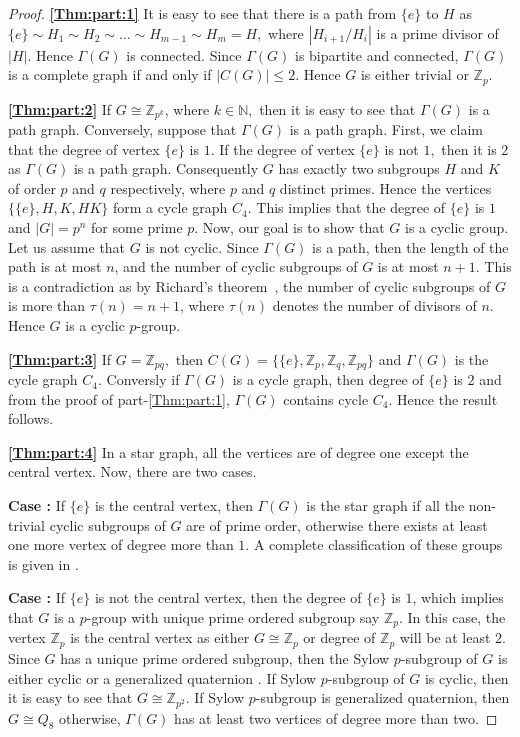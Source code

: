 \documentclass[11pt,twoside]{amsart}
\def \N {{\mathbb{N}}}
\def \Z {{\mathbb{Z}}}
\def \Ga {{\Gamma }}
\begin{document}
        \begin{proof}
     \textbf{\ref{Thm:part:1}}   
     It is easy to see that there is a path from $\{e\}$ to $H$ as $\{e\}\sim H_1\sim H_2 \sim \dots \sim H_{m-1}\sim H_m=H,$ where $|H_{i+1}/H_i|$ is a prime divisor of $|H|.$ Hence $\Gamma(G)$ is connected. Since $\Ga(G)$ is bipartite and connected, $\Ga(G)$ is a complete graph if and only if $|C(G)|\le 2$. Hence $G$ is either trivial or $\Z_p$.

     \noindent
\textbf{\ref{Thm:part:2}} If $G\cong \Z_{p^k}$, where $k\in \N,$ then it is easy to see that $\Ga(G)$ is a path graph. Conversely, suppose that $\Ga(G)$ is a path graph. First, we claim that the degree of vertex $\{e\}$ is $1.$ If the  degree of vertex $\{e\}$ is not $1,$ then it is $2$ as  $\Ga(G)$ is a path graph. Consequently $G$ has  exactly two  subgroups $H$ and $K$ of order $p$ and $q$ respectively, where $p$ and $q$ distinct primes. Hence the vertices $\{\{e\},H,K,HK\}$ form a cycle graph $C_4.$ This implies that the degree of $\{e\}$ is $1$ and $|G|=p^n$ for some prime $p$. Now, our goal is to show that $G$ is a cyclic group. Let us assume that $G$ is not cyclic. Since $\Gamma (G)$ is a path, then the length of the path is at most $n$, and the number of cyclic subgroups of $G$ is at most $n+1$. This is a contradiction as by Richard's theorem~\cite{richards1984remark}, the number of cyclic subgroups of $G$ is more than $\tau (n)=n+1$, where $\tau (n)$ denotes the number of divisors of $n$. Hence $G$ is a cyclic $p$-group.
                

          \noindent \textbf{\ref{Thm:part:3}} If $G=\Z_{pq},$ then $C(G)=\{\{e\},\Z_p,\Z_q, \Z_{pq}\}$ and $\Ga(G)$ is the cycle graph $C_4.$ Conversly if $\Ga(G)$ is a cycle graph, then degree of $\{e\}$ is $2$ and from the proof of part-\ref{Thm:part:1},  $\Ga(G)$ contains cycle $C_4.$ Hence the result follows.
          

     \noindent \textbf{\ref{Thm:part:4}} In a star graph, all the vertices are of degree one except the central vertex. Now, there are two cases.
     
    \textbf{Case :} If $\{e\}$ is the central vertex, then $\Gamma (G)$ is the star graph if all the non-trivial cyclic subgroups of $G$ are of prime order, otherwise there exists at least one more vertex of degree more than $1$. A complete classification of these groups is given in \cite{Cheng1993}.
    
\textbf{Case :} If $\{e\}$ is not the central vertex, then the degree of $\{e\}$ is $1$, which implies that $G$ is a $p$-group with unique prime ordered subgroup say $\Z_p$. In this case, the vertex $\Z_p$ is the central vertex as either $G\cong \Z_p$ or degree of $\Z_p$ will be at least $2$. Since $G$ has a unique prime ordered subgroup, then the Sylow $p$-subgroup of $G$ is either cyclic or a generalized quaternion \cite[Theorems 8.5,8.6]{burnside_2012}. If Sylow $p$-subgroup of $G$ is cyclic, then it is easy to see that $G\cong \Z_{p^2}$. If Sylow $p$-subgroup is generalized quaternion, then $G\cong Q_8$ otherwise, $\Gamma (G)$ has at least two vertices of degree more than two. 
\end{proof}
\end{document}
